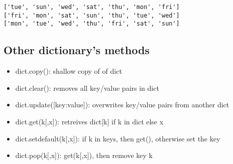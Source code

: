 \documentclass[11pt]{article}
\providecommand{\tightlist}{%
      \setlength{\itemsep}{0pt}\setlength{\parskip}{0pt}}
\begin{document}
    \begin{Verbatim}[commandchars=\\\{\}]
['tue', 'sun', 'wed', 'sat', 'thu', 'mon', 'fri']
['fri', 'mon', 'sat', 'sun', 'thu', 'tue', 'wed']
['mon', 'tue', 'wed', 'thu', 'fri', 'sat', 'sun']
    \end{Verbatim}

    \hypertarget{other-dictionarys-methods}{%
\subsection{Other dictionary's
methods}\label{other-dictionarys-methods}}

\begin{itemize}
\tightlist
\item
  dict.copy(): shallow copy of of dict
\item
  dict.clear(): removes all key/value pairs in dict
\item
  dict.update({[}key:value{]}): overwrites key/value pairs from another
  dict
\item
  dict.get(k{[},x{]}): retreives dict{[}k{]} if k in dict else x\\
\item
  dict.setdefault(k{[},x{]}): if k in keys, then get(), otherwise set
  the key
\item
  dict.pop(k{[},x{]}): get(k{[},x{]}), then remove key k
\end{itemize}
\end{document}
